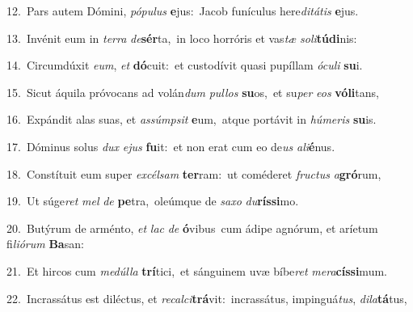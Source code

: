 {\numbfont\textcolor{\numbcolor}{12.}}~Pars autem Dómini, \textit{pó}\-\textit{pu}\textit{lus} \textbf{e}\-jus:~\star Jacob funículus here\-\textit{di}\-\textit{tá}\textit{tis} \textbf{e}\-jus.\par
{\numbfont\textcolor{\numbcolor}{13.}}~Invénit eum in \textit{ter}\-\textit{ra} \textit{de}\-\textbf{sér}ta,~\star in loco horróris et vas\textit{tæ} \textit{so}\-\textit{li}\textbf{tú}\textbf{di}nis:\par
{\numbfont\textcolor{\numbcolor}{14.}}~Circumdúxit \textit{e}\-\textit{um}, \textit{et} \textbf{dó}\-cuit:~\star et custodívit quasi pupíllam \textit{ó}\-\textit{cu}\textit{li} \textbf{su}\-i.\par
{\numbfont\textcolor{\numbcolor}{15.}}~Sicut áquila próvocans ad volán\textit{dum} \textit{pul}\-\textit{los} \textbf{su}\-os,~\star et su\textit{per} \textit{e}\-\textit{os} \textbf{vó}\-\textbf{li}tans,\par
{\numbfont\textcolor{\numbcolor}{16.}}~Expándit alas suas, et \textit{as}\-\textit{súmp}\textit{sit} \textbf{e}\-um,~\star atque portávit in \textit{hú}\-\textit{me}\textit{ris} \textbf{su}\-is.\par
{\numbfont\textcolor{\numbcolor}{17.}}~Dóminus solus \textit{dux} \textit{e}\-\textit{jus} \textbf{fu}\-it:~\star et non erat cum eo de\textit{us} \textit{a}\-\textit{li}\textbf{é}nus.\par
{\numbfont\textcolor{\numbcolor}{18.}}~Constítuit eum super \textit{ex}\-\textit{cél}\textit{sam} \textbf{ter}\-ram:~\star ut coméderet \textit{fruc}\-\textit{tus} \textit{a}\-\textbf{gró}rum,\par
{\numbfont\textcolor{\numbcolor}{19.}}~Ut súge\textit{ret} \textit{mel} \textit{de} \textbf{pe}\-tra,~\star oleúmque de \textit{sa}\-\textit{xo} \textit{du}\-\textbf{rís}\textbf{si}mo.\par
{\numbfont\textcolor{\numbcolor}{20.}}~Butýrum de arménto, \textit{et} \textit{lac} \textit{de} \textbf{ó}\-vibus~\star cum ádipe agnórum, et aríetum fi\-\textit{li}\-\textit{ó}\textit{rum} \textbf{Ba}\-san:\par
{\numbfont\textcolor{\numbcolor}{21.}}~Et hircos cum \textit{me}\-\textit{dúl}\textit{la} \textbf{trí}\-tici,~\star et sánguinem uvæ bíbe\textit{ret} \textit{me}\-\textit{ra}\textbf{cís}\textbf{si}mum.\par
{\numbfont\textcolor{\numbcolor}{22.}}~Incrassátus est diléctus, et \textit{re}\-\textit{cal}\textit{ci}\textbf{trá}vit:~\star incrassátus, impinguá\-\textit{tus}\-, \textit{di}\-\textit{la}\textbf{tá}tus,\par
